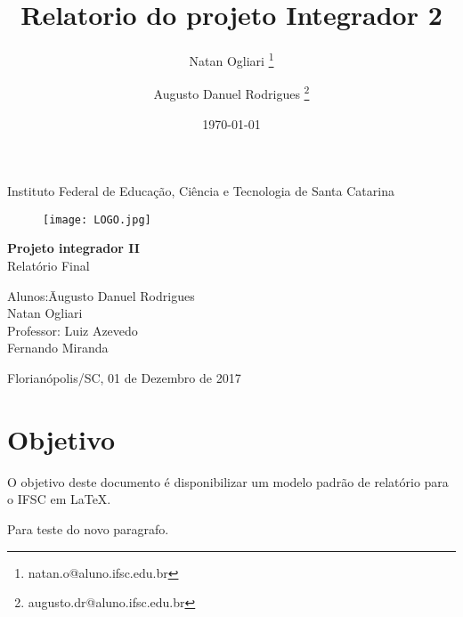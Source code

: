 \documentclass[a4paper, 12pt]{article}
\title{Relatorio do projeto Integrador 2} %
\author{Natan Ogliari \thanks{natan.o@aluno.ifsc.edu.br} \and Augusto Danuel Rodrigues \thanks{augusto.dr@aluno.ifsc.edu.br}} %
\date{\today}
\begin{document}

\begin{titlepage}
	\begin{center} %
		\huge{Instituto Federal de Educação, Ciência e Tecnologia de Santa Catarina}

\vspace{10pt} 
\begin{figure}[!ht]
\centering
\texttt{[image: LOGO.jpg]} %
\end{figure}
        
        \vspace{85pt}
        
		\textbf{\LARGE{Projeto integrador II}}\\
		\large{Relatório Final}
		\vspace{160pt}
		
	\end{center}
	
	\begin{flushleft}
		\begin{tabbing}
			Alunos:\qquad\qquad\= Augusto Danuel Rodrigues\\
			\>Natan Ogliari\\
            
			Professor:\> Luiz Azevedo \\
					  \> Fernando Miranda \\
		
	\end{tabbing}
		  
	\end{flushleft}
	
	\begin{center}
		\vspace{\fill}
		Florianópolis/SC, 01 de Dezembro de 2017
	\end{center}
\end{titlepage}
\newpage
\tableofcontents
\thispagestyle{empty}

\newpage
{}
\section{Objetivo}
O objetivo deste documento é disponibilizar um modelo padrão de relatório para o IFSC em \LaTeX.
\par Para teste do novo paragrafo.
\end{document}
